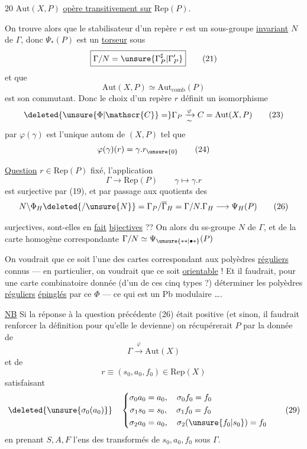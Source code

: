 $\boxed{20}$ $\mathrm{Aut}(X,P)$ \uline{opère transitivement sur} $\mathrm{Rep}(P)$.

On trouve alors que le stabilisateur  d'un repère $r$ est un sous-groupe \uline{invariant} $N$ de $\Gamma$, donc $\Psi_*(P)$ est un \uline{torseur} sous
\[
 \boxed{\Gamma/N=\unsure{\Gamma_P^\sharp|\Gamma'_P}}\tag*{(21)}
\]
et que
\[
 \boxed{\mathrm{Aut}(X,P)\simeq\mathrm{Aut}_{\mathrm{comb}}(P)}\tag*{(22)}
\]
est son commutant. Donc le choix d'un repère $r$ définit un isomorphisme
\[
 \deleted{\unsure{\Phi|\mathscr{C}}=}\Gamma_P\xrightarrow[\sim]{\varphi}C=\mathrm{Aut}(X,P)\tag*{(23)}
\]
par  $\varphi(\gamma)$ est l'unique autom de $(X,P)$ tel que
\[
 \varphi(\gamma)(r)=\gamma.r_{\unsure{0}}\tag*{(24)}
\]

\uline{Question}  $r\in\mathrm{Rep}(P)$ fixé, l'application
\[
 \Gamma\longrightarrow\mathrm{Rep}(P)\qquad \gamma\longmapsto\gamma.r\tag*{(25)}
\]
est surjective par (19), et  par passage aux quotients des
\[
 N\backslash\Phi_H\deleted{/\unsure{N}}=\Gamma_P/\overline\Gamma_H=\Gamma/N.\Gamma_H\longrightarrow\Psi_H(P)\tag*{(26)}
\]

surjectives, sont-elles en \uline{fait} \uline{bijectives} ?? On  alors du ss-groupe  $N$ de $\Gamma$,  et de la carte homogène correspondante $\Gamma/N\simeq\Psi_{\unsure{**|\bullet *}}(P)$

On voudrait que ce soit l'une des  cartes correspondant aux polyèdres \uline{réguliers} connus --- en particulier, on voudrait que ce soit \uline{orientable} ! Et il faudrait, pour une carte combinatoire donnée (d'un de ces cinq types ?) déterminer les polyèdres \uline{réguliers} \uline{épinglés} par ce $\Phi$ --- ce qui est un Pb modulaire \ldots.

\uline{NB} Si la réponse à la question précédente (26) était positive (et sinon, il faudrait renforcer la définition pour qu'elle le devienne) on récupérerait $P$ par la donnée de
\[
 \Gamma\xrightarrow{\varphi}\mathrm{Aut}(X)\tag*{(27)}
\]
et de
\[
 r\equiv(s_0,a_0,f_0)\in\mathrm{Rep}(X)\tag*{(28)}
\]
satisfaisant
\[
 \deleted{\unsure{\sigma_0(a_0)}}\quad
 \left\{\begin{aligned}
 \sigma_0a_0&=a_0,\quad\sigma_0f_0=f_0\\
 \sigma_1s_0&=s_0,\quad\sigma_1f_0=f_0\\
 \sigma_2a_0&=a_0,\quad\sigma_2(\unsure{f_0|s_0})=f_0
 \end{aligned}\right.\tag*{(29)}
\]
en prenant  $S,A,F$ l'ens des transformés de $s_0,a_0,f_0$ sous $\Gamma$.

